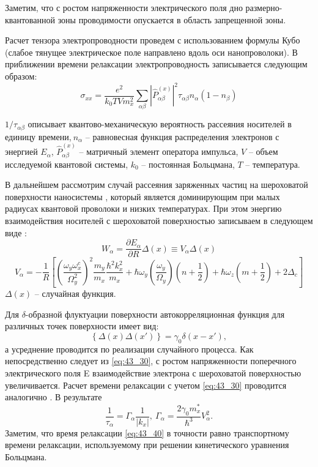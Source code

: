 Заметим, что с ростом напряженности электрического поля дно размерно-квантованной зоны проводимости опускается в область запрещенной зоны.

Расчет тензора электропроводности проведем с использованием формулы Кубо
\cite{Kubo1957a} (слабое тянущее электрическое поле направлено вдоль оси нанопроволоки). В приближении времени релаксации \cite{Khamidullin2002} электропроводность записывается следующим образом:
\begin{equation} \label{eq:43_20}
{\sigma }_{xx}=\frac{e^2}{k_0TVm^2_x}\sum_{\alpha \beta }{{\left|{\hat{P}}^{\left(x\right)}_{\alpha \beta }\right|}^2{\tau }_{\alpha \beta }n_{\alpha }\left(1-n_{\beta }\right)}
\end{equation}

${1}/{{\tau }_{\alpha \beta }}$ описывает квантово-механическую вероятность рассеяния носителей в единицу времени,$\ n_{\alpha }$ -- равновесная функция распределения электронов с энергией $E_{\alpha }$, ${\hat{P}}^{\left(x\right)}_{\alpha \beta }$ -- матричный элемент оператора импульса, $V$ -- объем исследуемой квантовой системы, $k_0$ --  постоянная Больцмана, $T$ --  температура.

В дальнейшем рассмотрим случай рассеяния заряженных частиц на шероховатой поверхности наносистемы \cite{Sakaki1987},  который является доминирующим при малых радиусах квантовой проволоки и низких температурах. При этом энергию взаимодействия носителей с шероховатой поверхностью записываем в следующем виде \cite{Sakaki1987,Motohisa1992}:
\begin{equation} \label{eq:43_30} 
W_{\alpha }=\frac{\partial E_{\alpha }}{\partial R}\Delta \left(x\right)\equiv V_{\alpha }\Delta \left(x\right) 
\end{equation}
\[
V_{\alpha }=-\frac{1}{R}\left[{\left(\frac{{\omega }_y{\omega }^c_x}{{\Omega }^2_y}\right)}^2\frac{m_y}{m_x}\frac{{\hbar }^2k^2_x}{m_x}+\hbar {\omega }_y\left(\frac{{\omega }_y}{{\Omega }_y}\right)\left(n+\frac{1}{2}\right)+\hbar {\omega }_z\left(m+\frac{1}{2}\right)+2{\Delta }_c\right]
\] 
$\Delta \left(x\right)$ -- случайная функция.

Для $\delta $-образной флуктуации поверхности автокорреляционная функция для различных точек поверхности имеет вид:
\[
\left\{\Delta \left(x\right)\Delta \left(x'\right)\right\}={\gamma }_0\delta \left(x-x'\right),
\] 
а усреднение проводится по реализации случайного процесса.  Как непосредственно следует из \eqref{eq:43_30}, с ростом напряженности поперечного электрического поля E взаимодействие электрона с шероховатой поверхностью увеличивается. Расчет времени релаксации с учетом \eqref{eq:43_30} проводится аналогично \cite{Karapetyan2011}. В результате
\begin{equation} \label{eq:43_40} 
\frac{1}{{\tau }_{\alpha }}={\Gamma }_{\alpha }\frac{1}{\left|k_x\right|},\ {\Gamma }_{\alpha }=\frac{2{\gamma }_0m^*_x}{{\hbar }^3}V^2_{\alpha }.  
\end{equation}
Заметим, что время релаксации \eqref{eq:43_40} в точности равно транспортному времени релаксации, используемому при решении кинетического уравнения Больцмана.

